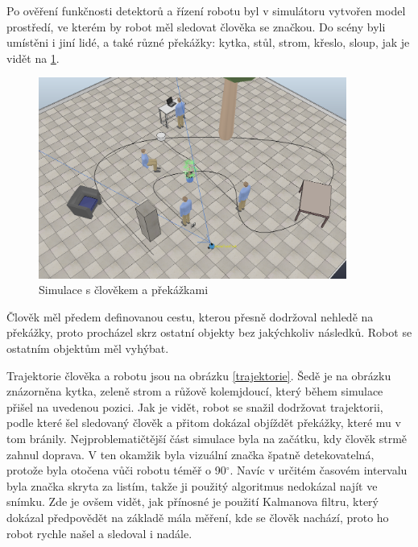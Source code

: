 \documentclass[twoside]{ctuthesis}
\theoremstyle{plain}
\theoremstyle{definition}
\theoremstyle{note}
\begin{document}
Po ověření funkčnosti detektorů a řízení robotu byl v simulátoru vytvořen model prostředí, ve kterém by robot měl sledovat člověka se značkou. Do scény byli umístěni i jiní lidé, a také různé překážky: kytka, stůl, strom, křeslo, sloup, jak je vidět na \ref{lidi}.
\begin{figure}[H]
	\caption{Simulace s člověkem a překážkami}

	\label{lidi}
	\includegraphics[width=0.9\textwidth]{images/5/people.png}
\end{figure}
Člověk měl předem definovanou cestu, kterou přesně dodržoval nehledě na překážky, proto procházel skrz ostatní objekty bez jakýchkoliv následků. Robot se ostatním objektům měl vyhýbat.

Trajektorie člověka a robotu jsou na obrázku \ref{trajektorie}. Šedě je na obrázku znázorněna kytka, zeleně strom a růžově kolemjdoucí, který během simulace přišel na uvedenou pozici. Jak je vidět, robot se snažil dodržovat trajektorii, podle které šel sledovaný člověk a přitom dokázal objíždět překážky, které mu v tom bránily. Nejproblematičtější část simulace byla na začátku, kdy člověk strmě zahnul doprava. V ten okamžik byla vizuální značka špatně detekovatelná, protože byla otočena vůči robotu téměř o 90$^\circ$. Navíc v určitém časovém intervalu byla značka skryta za listím, takže ji použitý algoritmus nedokázal najít ve snímku. Zde je ovšem vidět, jak přínosné je použití Kalmanova filtru, který dokázal předpovědět na základě mála měření, kde se člověk nachází, proto ho robot rychle našel a sledoval i nadále.
\end{document}
